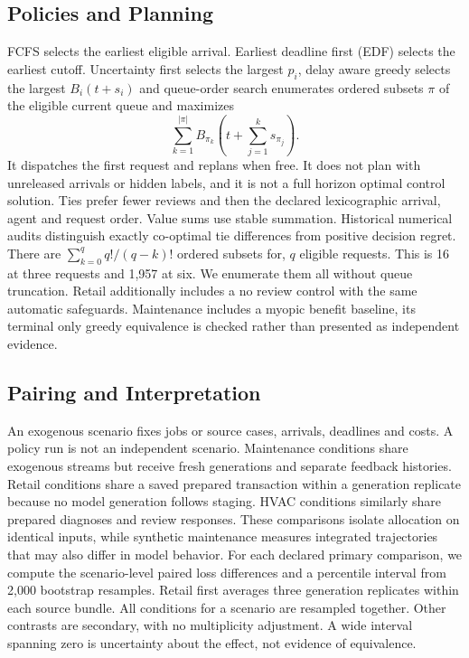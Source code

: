 \subsection{Policies and Planning}
FCFS selects the earliest eligible arrival. Earliest deadline first (EDF) selects the earliest cutoff. Uncertainty first selects the largest $p_i$, delay aware greedy selects the largest $B_i(t+s_i)$ and queue-order search enumerates ordered subsets $\pi$ of the eligible current queue and maximizes
\begin{equation}
 \sum_{k=1}^{|\pi|} B_{\pi_k}\left(t+\sum_{j=1}^{k}s_{\pi_j}\right).
 \label{eq:search}
\end{equation}
It dispatches the first request and replans when free. It does not plan with unreleased arrivals or hidden labels, and it is not a full horizon optimal control solution. Ties prefer fewer reviews and then the declared lexicographic arrival, agent and request order. Value sums use stable summation. Historical numerical audits distinguish exactly co-optimal tie differences from positive decision regret.
There are $\sum_{k=0}^{q}q!/(q-k)!$ ordered subsets for, $q$ eligible requests. This is 16 at three requests and 1,957 at six. We enumerate them all without queue truncation. Retail additionally includes a no review control with the same automatic safeguards. Maintenance includes a myopic benefit baseline, its terminal only greedy equivalence is checked rather than presented as independent evidence.



\subsection{Pairing and Interpretation}
An exogenous scenario fixes jobs or source cases, arrivals, deadlines and costs. A policy run is not an independent scenario. Maintenance conditions share exogenous streams but receive fresh generations and separate feedback histories. Retail conditions share a saved prepared transaction within a generation replicate because no model generation follows staging. HVAC conditions similarly share prepared diagnoses and review responses. These comparisons isolate allocation on identical inputs, while synthetic maintenance measures integrated trajectories that may also differ in model behavior.
For each declared primary comparison, we compute the scenario-level paired loss differences and a percentile interval from 2,000 bootstrap resamples. Retail first averages three generation replicates within each source bundle. All conditions for a scenario are resampled together. Other contrasts are secondary, with no multiplicity adjustment. A wide interval spanning zero is uncertainty about the effect, not evidence of equivalence.

